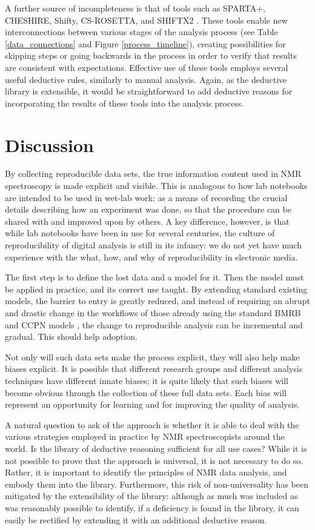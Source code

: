 A further source of incompleteness is that of tools such as SPARTA+, CHESHIRE,
Shifty, CS-ROSETTA, and SHIFTX2 \cite{sparta+, cheshire, shiftx2, cs-rosetta, shifty}.
These tools enable new interconnections between various stages of the analysis
process (see Table \ref{data_connections} and Figure \ref{process_timeline}), 
creating possibilities for skipping steps or going backwards in the
process in order to verify that results are consistent with expectations.  
Effective use of these tools employs several useful deductive rules, similarly
to manual analysis.  Again, as the deductive library is extensible, it would be
straightforward to add deductive reasons for incorporating the results of these
tools into the analysis process.


\section{Discussion}
By collecting reproducible data sets, the true information content used in
NMR spectroscopy is made explicit and visible.  This is analogous to how lab
notebooks are intended to be used in wet-lab work: as a means of recording
the crucial details describing how an experiment was done, so that the procedure
can be shared with and improved upon by others.  A key difference, however, is
that while lab notebooks have been in use for several centuries, the culture
of reproducibility of digital analysis is still in its infancy: we do not yet
have much experience with the what, how, and why of reproducibility in 
electronic media.

The first step is to define the lost data and a model for it.
Then the model must be applied in practice, and its correct use taught.
By extending standard existing models, the barrier to entry is greatly reduced,
and instead of requiring an abrupt and drastic change in the workflows of those
already using the standard BMRB and CCPN models \cite{bmrb, ccpn}, the change 
to reproducible analysis can be incremental and gradual.  This should help 
adoption.

Not only will such data sets make the process explicit, they will also help
make biases explicit.  It is possible that different research groups and
different analysis techniques have different innate biases; it is quite likely
that such biases will become obvious through the collection of these full data
sets.  Each bias will represent an opportunity for learning and for improving
the quality of analysis.

A natural question to ask of the approach is whether it is able to deal with 
the various strategies employed in practice by NMR spectroscopists around the
world.  Is the library of deductive reasoning sufficient for all use cases?
While it is not possible to prove that the approach is universal, it is not
necessary to do so.  Rather, it is important to identify the principles of
NMR data analysis, and embody them into the library.  Furthermore, this risk
of non-universality has been mitigated by the extensibility of the library:
although as much was included as was reasonably possible to identify, if 
a deficiency is found in the library, it can easily be rectified by extending
it with an additional deductive reason.


